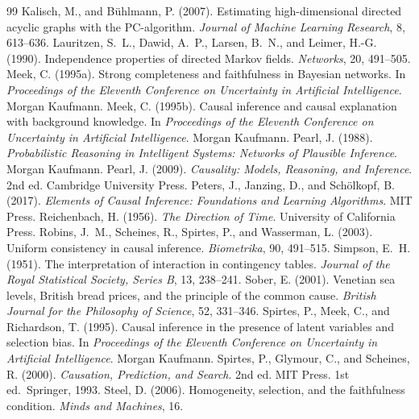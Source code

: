 \documentclass{situationist-preprint}
\begin{document}
\begin{thebibliography}{99}
 Kalisch, M., and B\"uhlmann, P. (2007). Estimating high-dimensional directed acyclic graphs with the PC-algorithm. \emph{Journal of Machine Learning Research}, 8, 613--636.
 Lauritzen, S.~L., Dawid, A.~P., Larsen, B.~N., and Leimer, H.-G. (1990). Independence properties of directed Markov fields. \emph{Networks}, 20, 491--505.
 Meek, C. (1995a). Strong completeness and faithfulness in Bayesian networks. In \emph{Proceedings of the Eleventh Conference on Uncertainty in Artificial Intelligence}. Morgan Kaufmann.
 Meek, C. (1995b). Causal inference and causal explanation with background knowledge. In \emph{Proceedings of the Eleventh Conference on Uncertainty in Artificial Intelligence}. Morgan Kaufmann.
 Pearl, J. (1988). \emph{Probabilistic Reasoning in Intelligent Systems: Networks of Plausible Inference}. Morgan Kaufmann.
 Pearl, J. (2009). \emph{Causality: Models, Reasoning, and Inference}. 2nd ed. Cambridge University Press.
 Peters, J., Janzing, D., and Sch\"olkopf, B. (2017). \emph{Elements of Causal Inference: Foundations and Learning Algorithms}. MIT Press.
 Reichenbach, H. (1956). \emph{The Direction of Time}. University of California Press.
 Robins, J.~M., Scheines, R., Spirtes, P., and Wasserman, L. (2003). Uniform consistency in causal inference. \emph{Biometrika}, 90, 491--515.
 Simpson, E.~H. (1951). The interpretation of interaction in contingency tables. \emph{Journal of the Royal Statistical Society, Series B}, 13, 238--241.
 Sober, E. (2001). Venetian sea levels, British bread prices, and the principle of the common cause. \emph{British Journal for the Philosophy of Science}, 52, 331--346.
 Spirtes, P., Meek, C., and Richardson, T. (1995). Causal inference in the presence of latent variables and selection bias. In \emph{Proceedings of the Eleventh Conference on Uncertainty in Artificial Intelligence}. Morgan Kaufmann.
 Spirtes, P., Glymour, C., and Scheines, R. (2000). \emph{Causation, Prediction, and Search}. 2nd ed. MIT Press. 1st ed.\ Springer, 1993.
 Steel, D. (2006). Homogeneity, selection, and the faithfulness condition. \emph{Minds and Machines}, 16.

\end{thebibliography}
\end{document}
